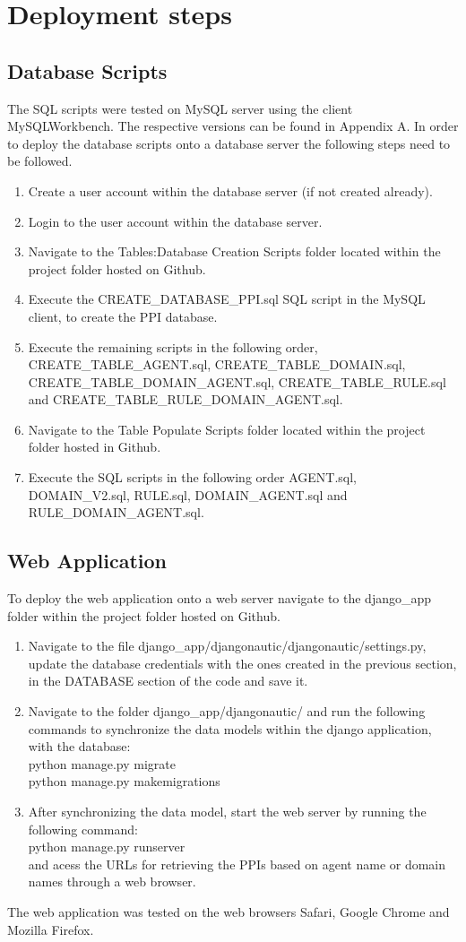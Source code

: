 \documentclass[msc,deptreport,ai]{infthesis}      %
\begin{document}
\section{Deployment steps}
\subsection{Database Scripts}
 The SQL scripts were tested on MySQL server using the client MySQLWorkbench. The respective versions can be found in Appendix A. In order to deploy the database scripts onto a database server the following steps need to be followed.
 \begin{enumerate}
 	\item Create a user account within the database server (if not created already).
 	\item Login to the user account within the database server.
 	\item Navigate to the Tables:Database Creation Scripts folder located within the project folder hosted on Github. 
 	\item Execute the CREATE\_DATABASE\_PPI.sql SQL script in the MySQL client, to create the PPI database.
 	\item Execute the remaining scripts in the following order, CREATE\_TABLE\_AGENT.sql, CREATE\_TABLE\_DOMAIN.sql, CREATE\_TABLE\_DOMAIN\_AGENT.sql, CREATE\_TABLE\_RULE.sql and CREATE\_TABLE\_RULE\_DOMAIN\_AGENT.sql.
 	\item Navigate to the Table Populate Scripts folder located within the project folder hosted in Github.
 	\item Execute the SQL scripts in the following order AGENT.sql, DOMAIN\_V2.sql, RULE.sql, DOMAIN\_AGENT.sql and RULE\_DOMAIN\_AGENT.sql.
 \end{enumerate}
\subsection{Web Application}
To deploy the web application onto a web server navigate to the django\_app folder within the project folder hosted on Github.
\begin{enumerate}
	\item Navigate to the file django\_app/djangonautic/djangonautic/settings.py, update the database credentials with the ones created in the previous section, in the DATABASE section of the code and save it.
	\item Navigate to the folder django\_app/djangonautic/ and run the following commands to synchronize the data models within the django application, with the database:\\
	python manage.py migrate \\
	python manage.py makemigrations
	\item After synchronizing the data model, start the web server by running the following command:\\
	python manage.py runserver\\
	and acess the URLs for retrieving the PPIs based on agent name or domain names through a web browser.	
\end{enumerate}
The web application was tested on the web browsers Safari, Google Chrome and Mozilla Firefox.
\end{document}
